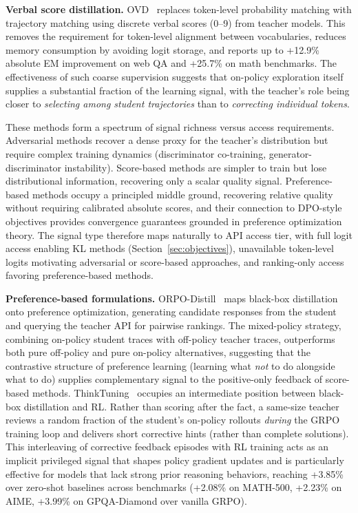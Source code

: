 \documentclass{article} %
\begin{document}
\textbf{Verbal score distillation.} OVD~\citep{2601.21968} replaces token-level probability matching with trajectory matching using discrete verbal scores (0--9) from teacher models. This removes the requirement for token-level alignment between vocabularies, reduces memory consumption by avoiding logit storage, and reports up to +12.9\% absolute EM improvement on web QA and +25.7\% on math benchmarks. The effectiveness of such coarse supervision suggests that on-policy exploration itself supplies a substantial fraction of the learning signal, with the teacher's role being closer to \emph{selecting among student trajectories} than to \emph{correcting individual tokens}.

These methods form a spectrum of signal richness versus access requirements. Adversarial methods recover a dense proxy for the teacher's distribution but require complex training dynamics (discriminator co-training, generator-discriminator instability). Score-based methods are simpler to train but lose distributional information, recovering only a scalar quality signal. Preference-based methods occupy a principled middle ground, recovering relative quality without requiring calibrated absolute scores, and their connection to DPO-style objectives provides convergence guarantees grounded in preference optimization theory. The signal type therefore maps naturally to API access tier, with full logit access enabling KL methods (Section~\ref{sec:objectives}), unavailable token-level logits motivating adversarial or score-based approaches, and ranking-only access favoring preference-based methods.

\textbf{Preference-based formulations.} ORPO-Distill~\citep{2509.25100} maps black-box distillation onto preference optimization, generating candidate responses from the student and querying the teacher API for pairwise rankings. The mixed-policy strategy, combining on-policy student traces with off-policy teacher traces, outperforms both pure off-policy and pure on-policy alternatives, suggesting that the contrastive structure of preference learning (learning what \emph{not} to do alongside what to do) supplies complementary signal to the positive-only feedback of score-based methods. ThinkTuning~\citep{2508.07616} occupies an intermediate position between black-box distillation and RL. Rather than scoring after the fact, a same-size teacher reviews a random fraction of the student's on-policy rollouts \emph{during} the GRPO training loop and delivers short corrective hints (rather than complete solutions). This interleaving of corrective feedback episodes with RL training acts as an implicit privileged signal that shapes policy gradient updates and is particularly effective for models that lack strong prior reasoning behaviors, reaching +3.85\% over zero-shot baselines across benchmarks (+2.08\% on MATH-500, +2.23\% on AIME, +3.99\% on GPQA-Diamond over vanilla GRPO).
\end{document}
